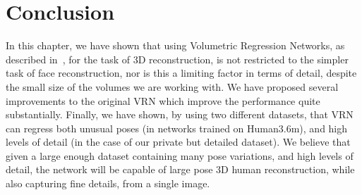 
\section{Conclusion}

In this chapter, we have shown that using Volumetric Regression Networks,
as described in~\cite{jackson2017vrn}, for the task of 3D
reconstruction, is not restricted to the simpler task of face
reconstruction, nor is this a limiting factor in terms of detail,
despite the small size of the volumes we are working with. We have
proposed several improvements to the original VRN which improve the
performance quite substantially. Finally, we have shown, by using two
different datasets, that VRN can regress both unusual poses (in
networks trained on Human3.6m), and high levels of detail (in the case
of our private but detailed dataset). We believe that given a large
enough dataset containing many pose variations, and high levels of
detail, the network will be capable of large pose 3D human
reconstruction, while also capturing fine details, from a single
image.






% 
% 
% 



